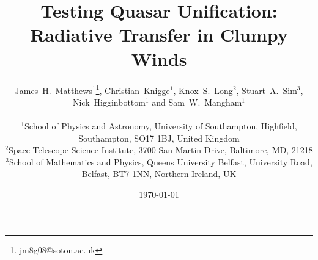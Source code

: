 \documentclass[useAMS,usenatbib]{mn2e_x}
\begin{document}


\def\py{\textsc{Python}}
\def\tar{\textsc{Tardis}}
\def\cld{\textsc{Cloudy}}
\def\agn{\textsc{Agnspec}}


\def\civ{C~\textsc{iv}}
\def\nv{N~\textsc{v}}
\def\hei{He~\textsc{i}}
\def\heii{He~\textsc{ii}}
\def\heiiline{He~\textsc{ii}~$4686$\AA}
\def\mg{Mg~\textsc{ii}}
\def\al{Al~\textsc{iii}}
\def\heii{He~\textsc{ii}}
\def\ovi{O~\textsc{vi}}
\def\la{Ly~$\alpha$}
\def\ha{H$\alpha$}
\def\hb{H$\beta$}
\def\civline{C~\textsc{iv}~$1550$\AA}
\def\nvline{N~\textsc{v}~$1240$\AA}
\def\mgline{Mg~\textsc{ii}~$2800$\AA}


\def\araa{ARAA}
\def\nat{Nature}
\def\apjl{ApJ Letters}
\def\aapr{AAPR}
\def\ssr{SSR}
\def\apj{ApJ}
\def\apjs{ApJs}
\def\pasp{PASP}
\def\aap{A\&A}
\def\mnras{MNRAS}
\def\aj{AJ}
\def\rmxaa{RMXAA}
\def\aaps{A\&As}
\def\LA{Lyman\thinspace$\alpha$}

\newcommand{\EXPN}[2]{\mbox{$#1\times 10^{#2}$}}
\newcommand{\EXPU}[3]{\mbox{\rm $#1 \times 10^{#2} \rm\:#3$}}  %
\newcommand{\POW}[2]{\mbox{$\rm10^{#1}\rm\:#2$}}
\def\LUM{\:{\rm erg\:s^{-1}}}
\def\FLUX{\:{\rm erg\:cm^{-2}\:s^{-1}}}
\def\OIGS{\:{\rm erg\:cm^{-2}\:s^{-1}\:\AA^{-1}}}

%
%

\title
[Testing Quasar Unification: Radiative Transfer in Clumpy Winds]{
Testing Quasar Unification: Radiative Transfer in Clumpy Winds
}


\author[Matthews et al.]{
\parbox[t]{\textwidth}{
James~H.~Matthews$^1$\thanks{jm8g08@soton.ac.uk}, Christian~Knigge$^1$, 
Knox~S.~Long$^2$, Stuart~A.~Sim$^3$, Nick~Higginbottom$^1$ and Sam~W.~Mangham$^1$
}
\medskip  
\\$^1$School of Physics and Astronomy, University of Southampton, Highfield, Southampton, SO17 1BJ, United Kingdom
\\$^2$Space Telescope Science Institute, 3700 San Martin Drive, Baltimore, MD, 21218
\\$^3$School of Mathematics and Physics, Queens University Belfast, University Road, Belfast, BT7 1NN, Northern Ireland, UK
}


\date{\today}
\end{document}
